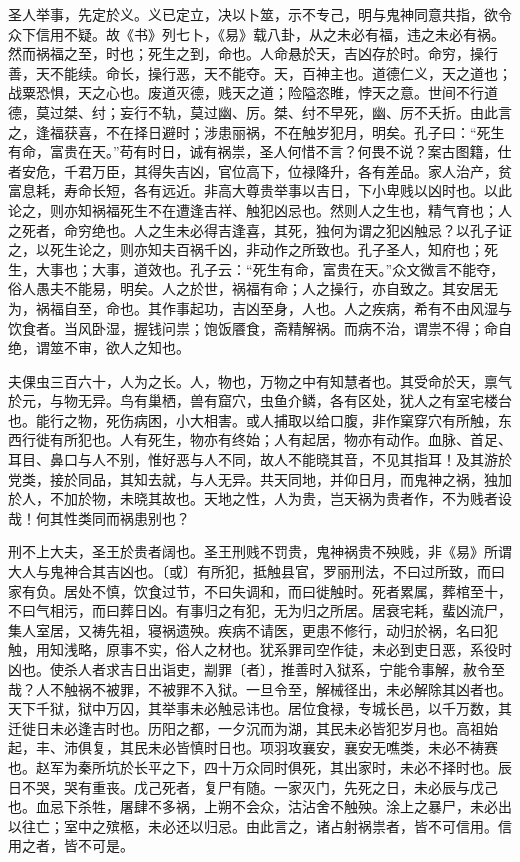 \documentclass[]{article}
\begin{document}
圣人举事，先定於义。义已定立，决以卜筮，示不专己，明与鬼神同意共指，欲令众下信用不疑。故《书》列七卜，《易》载八卦，从之未必有福，违之未必有祸。然而祸福之至，时也；死生之到，命也。人命悬於天，吉凶存於时。命穷，操行善，天不能续。命长，操行恶，天不能夺。天，百神主也。道德仁义，天之道也；战粟恐惧，天之心也。废道灭德，贱天之道；险隘恣睢，悖天之意。世间不行道德，莫过桀、纣；妄行不轨，莫过幽、厉。桀、纣不早死，幽、厉不夭折。由此言之，逢福获喜，不在择日避时；涉患丽祸，不在触岁犯月，明矣。孔子曰：``死生有命，富贵在天。''苟有时日，诚有祸祟，圣人何惜不言？何畏不说？案古图籍，仕者安危，千君万臣，其得失吉凶，官位高下，位禄降升，各有差品。家人治产，贫富息耗，寿命长短，各有远近。非高大尊贵举事以吉日，下小卑贱以凶时也。以此论之，则亦知祸福死生不在遭逢吉祥、触犯凶忌也。然则人之生也，精气育也；人之死者，命穷绝也。人之生未必得吉逢喜，其死，独何为谓之犯凶触忌？以孔子证之，以死生论之，则亦知夫百祸千凶，非动作之所致也。孔子圣人，知府也；死生，大事也；大事，道效也。孔子云：``死生有命，富贵在天。''众文微言不能夺，俗人愚夫不能易，明矣。人之於世，祸福有命；人之操行，亦自致之。其安居无为，祸福自至，命也。其作事起功，吉凶至身，人也。人之疾病，希有不由风湿与饮食者。当风卧湿，握钱问祟；饱饭餍食，斋精解祸。而病不治，谓祟不得；命自绝，谓筮不审，欲人之知也。

夫倮虫三百六十，人为之长。人，物也，万物之中有知慧者也。其受命於天，禀气於元，与物无异。鸟有巢栖，兽有窟穴，虫鱼介鳞，各有区处，犹人之有室宅楼台也。能行之物，死伤病困，小大相害。或人捕取以给口腹，非作窠穿穴有所触，东西行徙有所犯也。人有死生，物亦有终始；人有起居，物亦有动作。血脉、首足、耳目、鼻口与人不别，惟好恶与人不同，故人不能晓其音，不见其指耳！及其游於党类，接於同品，其知去就，与人无异。共天同地，并仰日月，而鬼神之祸，独加於人，不加於物，未晓其故也。天地之性，人为贵，岂天祸为贵者作，不为贱者设哉！何其性类同而祸患别也？

刑不上大夫，圣王於贵者阔也。圣王刑贱不罚贵，鬼神祸贵不殃贱，非《易》所谓大人与鬼神合其吉凶也。〔或〕有所犯，抵触县官，罗丽刑法，不曰过所致，而曰家有负。居处不慎，饮食过节，不曰失调和，而曰徙触时。死者累属，葬棺至十，不曰气相污，而曰葬日凶。有事归之有犯，无为归之所居。居衰宅耗，蜚凶流尸，集人室居，又祷先祖，寝祸遗殃。疾病不请医，更患不修行，动归於祸，名曰犯触，用知浅略，原事不实，俗人之材也。犹系罪司空作徒，未必到吏日恶，系役时凶也。使杀人者求吉日出诣吏，剬罪〔者〕，推善时入狱系，宁能令事解，赦令至哉？人不触祸不被罪，不被罪不入狱。一旦令至，解械径出，未必解除其凶者也。天下千狱，狱中万囚，其举事未必触忌讳也。居位食禄，专城长邑，以千万数，其迁徙日未必逢吉时也。历阳之都，一夕沉而为湖，其民未必皆犯岁月也。高祖始起，丰、沛俱复，其民未必皆慎时日也。项羽攻襄安，襄安无噍类，未必不祷赛也。赵军为秦所坑於长平之下，四十万众同时俱死，其出家时，未必不择时也。辰日不哭，哭有重丧。戊己死者，复尸有随。一家灭门，先死之日，未必辰与戊己也。血忌下杀牲，屠肆不多祸，上朔不会众，沽沾舍不触殃。涂上之暴尸，未必出以往亡；室中之殡柩，未必还以归忌。由此言之，诸占射祸祟者，皆不可信用。信用之者，皆不可是。
\end{document}
